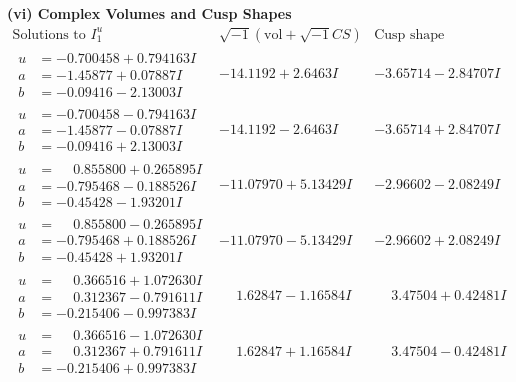 \documentclass[1p]{elsarticle_modified}
\theoremstyle{definition}
\newcommand{\I}{\sqrt{-1}}
\begin{document}
\newpage\flushleft \textbf{(vi) Complex Volumes and Cusp Shapes}
$$\begin{array}{c|c|c}  
\text{Solutions to }I^u_{1}& \I (\text{vol} + \sqrt{-1}CS) & \text{Cusp shape}\\
 \hline 
\begin{aligned}
u &= -0.700458 + 0.794163 I \\
a &= -1.45877 + 0.07887 I \\
b &= -0.09416 - 2.13003 I\end{aligned}
 & -14.1192 + 2.6463 I & -3.65714 - 2.84707 I \\ \hline\begin{aligned}
u &= -0.700458 - 0.794163 I \\
a &= -1.45877 - 0.07887 I \\
b &= -0.09416 + 2.13003 I\end{aligned}
 & -14.1192 - 2.6463 I & -3.65714 + 2.84707 I \\ \hline\begin{aligned}
u &= \phantom{-}0.855800 + 0.265895 I \\
a &= -0.795468 - 0.188526 I \\
b &= -0.45428 - 1.93201 I\end{aligned}
 & -11.07970 + 5.13429 I & -2.96602 - 2.08249 I \\ \hline\begin{aligned}
u &= \phantom{-}0.855800 - 0.265895 I \\
a &= -0.795468 + 0.188526 I \\
b &= -0.45428 + 1.93201 I\end{aligned}
 & -11.07970 - 5.13429 I & -2.96602 + 2.08249 I \\ \hline\begin{aligned}
u &= \phantom{-}0.366516 + 1.072630 I \\
a &= \phantom{-}0.312367 - 0.791611 I \\
b &= -0.215406 - 0.997383 I\end{aligned}
 & \phantom{-}1.62847 - 1.16584 I & \phantom{-}3.47504 + 0.42481 I \\ \hline\begin{aligned}
u &= \phantom{-}0.366516 - 1.072630 I \\
a &= \phantom{-}0.312367 + 0.791611 I \\
b &= -0.215406 + 0.997383 I\end{aligned}
 & \phantom{-}1.62847 + 1.16584 I & \phantom{-}3.47504 - 0.42481 I \\ \hline\begin{aligned}

\end{aligned}
\end{array}$$
\end{document}
